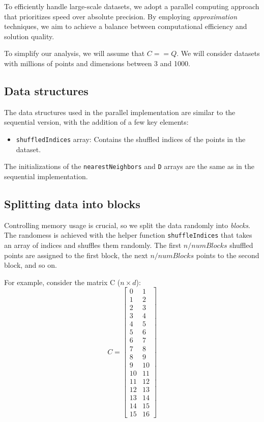 \documentclass{article}
\begin{document}
To efficiently handle large-scale datasets, we adopt a parallel computing approach that prioritizes speed over absolute precision. 
By employing \emph{approximation} techniques, we aim to achieve a balance between computational efficiency and solution quality.

To simplify our analysis, we will assume that $C==Q$. We will consider datasets with millions of points and dimensions between 3 and 1000.

\subsection{Data structures}
The data structures used in the parallel implementation are similar to the sequential version, with the addition of a few key elements:
\begin{itemize}
    \item \texttt{shuffledIndices} array: Contains the shuffled indices of the points in the dataset.
    
\end{itemize}

The initializations of the \texttt{nearestNeighbors} and \texttt{D} arrays are the same as in the sequential implementation.

\subsection{Splitting data into blocks}
Controlling memory usage is crucial, so we split the data randomly into \emph{blocks}. The randomess is achieved with the helper 
function \texttt{shuffleIndices} that takes an array of indices and shuffles them randomly. The first $n / numBlocks$ shuffled
points are assigned to the first block, the next $n / numBlocks$ points to the second block, and so on.

For example, consider the matrix C ($n \times d$):
\[
C = \begin{bmatrix}
0 & 1 \\
1 & 2 \\
2 & 3 \\
3 & 4 \\
4 & 5 \\
5 & 6 \\
6 & 7 \\
7 & 8 \\
8 & 9 \\
9 & 10 \\
10 & 11 \\
11 & 12 \\
12 & 13 \\
13 & 14 \\
14 & 15 \\
15 & 16
\end{bmatrix}
\]
\end{document}

